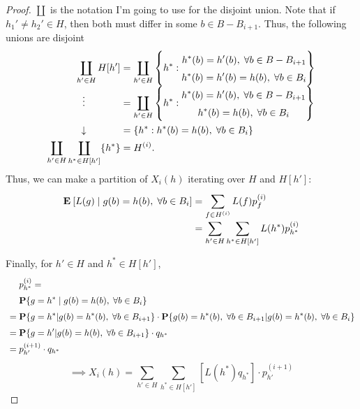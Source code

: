 \begin{proof}
$\coprod$ is the notation I'm going to use for the disjoint union. Note that if $h_1'\neq h_2' \in H$, then both must differ in some $b \in B- B_{i+1}$. Thus, the following unions are disjoint
\[\everymath{\displaystyle}\arraycolsep=1.4pt\def\arraystretch{1.5}
    \begin{array}{rcl}
    \coprod_{h' \in H} H[h'] & = & 
    \coprod_{h' \in H} \left\{ h^*: \begin{matrix}
        h^*(b) = h'(b),\; \forall b\in B-B_{i+1}\\
        h^*(b) = h'(b) = h(b) ,\; \forall b\in B_{i}
    \end{matrix} \right\}\\
   \hfill\vdots\hfill & = & \coprod_{h' \in H} \left\{ h^*: \begin{matrix}
        h^*(b) = h'(b),\; \forall b\in B-B_{i+1}\\
        h^*(b) = h(b) ,\; \forall b\in B_{i}
    \end{matrix} \right\}\\
    \hfill\downarrow\hfill& = & \{h^*: h^*(b) = h(b) ,\; \forall b\in B_{i} \}\\
    \coprod_{h' \in H} \coprod_{h^* \in H[h']}\{h^*\} & = & H^{(i)}.
\end{array} \] 
Thus, we can make a partition of $X_i(h)$ iterating over $H$ and $H[h']$:
\[\everymath{\displaystyle}\arraycolsep=1.4pt\def\arraystretch{1.5} 
\begin{array}{lcl}
    \E[L(g) \;|\; g(b) = h(b),\; \forall b\in B_{i}] & = & \sum_{f\in H^{(i)}} L(f) p_{f}^{(i)}\\
    & = &  \sum_{h' \in H}\sum_{h^* \in H[h']} L(h^*) p^{(i)}_{h^*}
\end{array}\] 

Finally, for $h' \in H$ and $h^* \in H[h']$,
\[ \everymath{\displaystyle}\arraycolsep=1.4pt\def\arraystretch{1.5} 
\begin{array}{lll}
    & & p^{(i)}_{h^*} = \\
    & & \P\{g = h^* \;|\; g(b) = h(b),\; \forall b\in B_i\}\\
    & = & \P\{g = h^* | g(b) = h^*(b),\; \forall b\in B_{i+1} \} \cdot \P\{g(b) = h^*(b),\;\forall b\in B_{i+1} | g(b) = h^*(b),\; \forall b\in B_{i} \}\\
    & = & \P\{g = h' | g(b) = h(b),\; \forall b\in B_{i+1} \} \cdot q_{h^*}\\
    & = & p_{h'}^{(i+1)}\cdot q_{h^*}
\end{array}  \] 
\[ \implies X_i(h) = \sum_{h' \in H}\sum_{h^* \in H[h']} [L(h^*) q_{h^*}] \cdot p_{h'}^{(i+1)} \] 


\end{proof}
